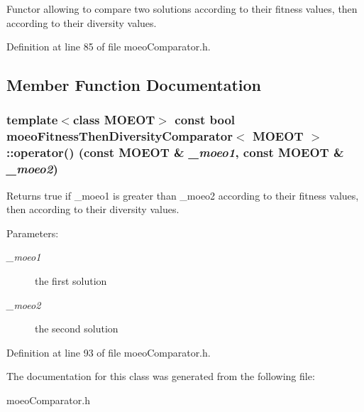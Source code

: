 Functor allowing to compare two solutions according to their fitness values, then according to their diversity values. 



Definition at line 85 of file moeo\-Comparator.h.

\subsection{Member Function Documentation}
\subsubsection{\setlength{\rightskip}{0pt plus 5cm}template$<$class MOEOT$>$ const bool {\bf moeo\-Fitness\-Then\-Diversity\-Comparator}$<$ MOEOT $>$::operator() (const MOEOT \& {\em \_\-moeo1}, const MOEOT \& {\em \_\-moeo2})\hspace{0.3cm}{\tt  [inline]}}\label{classmoeoFitnessThenDiversityComparator_087856d1a7d81f242e95591d694e3ef6}


Returns true if \_\-moeo1 is greater than \_\-moeo2 according to their fitness values, then according to their diversity values. 

\begin{Desc}
\item[Parameters:]
\begin{description}
\item[{\em \_\-moeo1}]the first solution \item[{\em \_\-moeo2}]the second solution \end{description}
\end{Desc}


Definition at line 93 of file moeo\-Comparator.h.

The documentation for this class was generated from the following file:\begin{CompactItemize}
\item 
moeo\-Comparator.h\end{CompactItemize}
